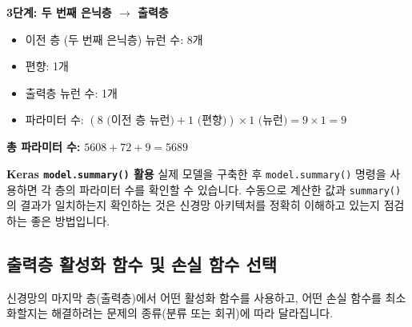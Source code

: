 \documentclass[11pt,a4paper]{book}
\theoremstyle{definition}
\begin{document}
\begin{enumerate}
\begin{examplebox}
    \textbf{3단계: 두 번째 은닉층 $\rightarrow$ 출력층}
    \begin{itemize}
        \item 이전 층 (두 번째 은닉층) 뉴런 수: 8개
        \item 편향: 1개
        \item 출력층 뉴런 수: 1개
        \item 파라미터 수: $(8 \text{ (이전 층 뉴런)} + 1 \text{ (편향)}) \times 1 \text{ (뉴런)} = 9 \times 1 = 9$
    \end{itemize}

    \textbf{총 파라미터 수:} $5608 + 72 + 9 = 5689$
    \end{examplebox}

    \begin{tipbox}
    \textbf{Keras \texttt{model.summary()} 활용}
    실제 모델을 구축한 후 \texttt{model.summary()} 명령을 사용하면 각 층의 파라미터 수를 확인할 수 있습니다. 수동으로 계산한 값과 \texttt{summary()}의 결과가 일치하는지 확인하는 것은 신경망 아키텍처를 정확히 이해하고 있는지 점검하는 좋은 방법입니다.
    \end{tipbox}
\end{enumerate}

\subsection{출력층 활성화 함수 및 손실 함수 선택}
신경망의 마지막 층(출력층)에서 어떤 활성화 함수를 사용하고, 어떤 손실 함수를 최소화할지는 해결하려는 문제의 종류(분류 또는 회귀)에 따라 달라집니다.
\end{document}
